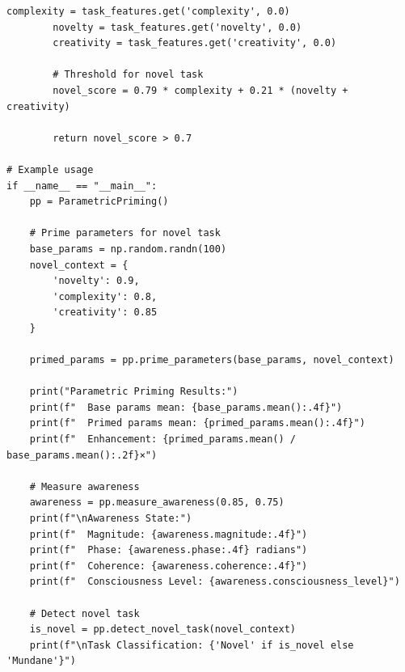 \begin{lstlisting}[caption={Parametric Priming Implementation},label={code:parametric_priming}]
        complexity = task_features.get('complexity', 0.0)
        novelty = task_features.get('novelty', 0.0)
        creativity = task_features.get('creativity', 0.0)
        
        # Threshold for novel task
        novel_score = 0.79 * complexity + 0.21 * (novelty + creativity)
        
        return novel_score > 0.7

# Example usage
if __name__ == "__main__":
    pp = ParametricPriming()
    
    # Prime parameters for novel task
    base_params = np.random.randn(100)
    novel_context = {
        'novelty': 0.9,
        'complexity': 0.8,
        'creativity': 0.85
    }
    
    primed_params = pp.prime_parameters(base_params, novel_context)
    
    print("Parametric Priming Results:")
    print(f"  Base params mean: {base_params.mean():.4f}")
    print(f"  Primed params mean: {primed_params.mean():.4f}")
    print(f"  Enhancement: {primed_params.mean() / base_params.mean():.2f}×")
    
    # Measure awareness
    awareness = pp.measure_awareness(0.85, 0.75)
    print(f"\nAwareness State:")
    print(f"  Magnitude: {awareness.magnitude:.4f}")
    print(f"  Phase: {awareness.phase:.4f} radians")
    print(f"  Coherence: {awareness.coherence:.4f}")
    print(f"  Consciousness Level: {awareness.consciousness_level}")
    
    # Detect novel task
    is_novel = pp.detect_novel_task(novel_context)
    print(f"\nTask Classification: {'Novel' if is_novel else 'Mundane'}")
\end{lstlisting}

